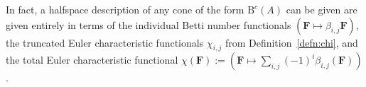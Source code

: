 \documentclass[12pt]{amsart}
\theoremstyle{definition}
\theoremstyle{remark}
\newcommand{\bb}{c}
\newcommand{\FF}{\mathbf{F}}
\newcommand{\Gbull}{\mathbf{G}}
\newcommand{\BBQ}{\mathrm{B}}
\begin{document}

In fact, a halfspace description of any cone of the form $\BBQ^{\bb}(A)$ can be given are given entirely in terms of the individual Betti number functionals $(\FF\mapsto \beta_{i,j}\FF)$, the truncated Euler characteristic functionals $\chi_{i,j}$ from Definition~\ref{defn:chi}, and the total Euler characteristic functional $\chi(\FF):=(\FF\mapsto \sum_{i,j}(-1)^i \beta_{i,j}(\FF))$.  
\end{document}
